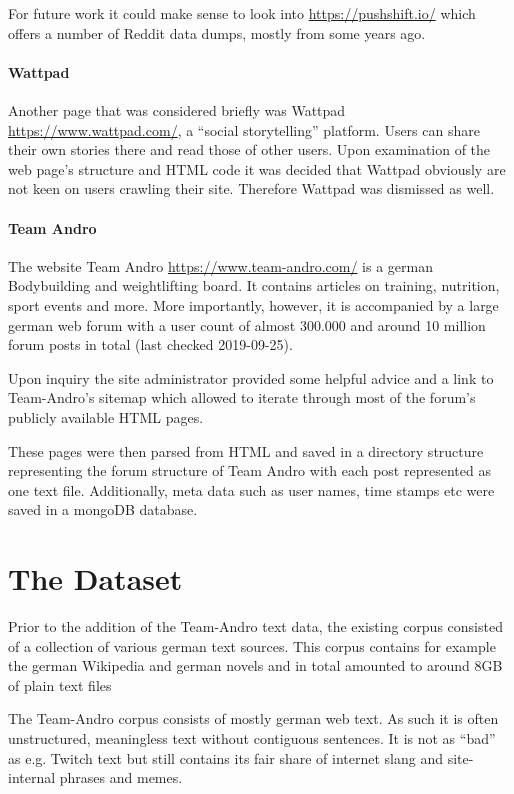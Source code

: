 \documentclass[sigconf,natbib=false]{acmart}
\begin{document}
For future work it could make sense to look into \url{https://pushshift.io/} which offers a number of Reddit data dumps, mostly from some years ago.

\paragraph{Wattpad}

Another page that was considered briefly was Wattpad \url{https://www.wattpad.com/}, a \enquote{social storytelling} platform. Users can share their own stories there and read those of other users. Upon examination of the web page's structure and HTML code it was decided that Wattpad obviously are not keen on users crawling their site. Therefore Wattpad was dismissed as well.

\paragraph{Team Andro} The website Team Andro \url{https://www.team-andro.com/} is a german Bodybuilding and weightlifting board. It contains articles on training, nutrition, sport events and more. More importantly, however, it is accompanied by a large german web forum with a user count of almost 300.000 and around 10 million forum posts in total (last checked 2019-09-25).

Upon inquiry the site administrator provided some helpful advice and a link to Team-Andro's sitemap which allowed to iterate through most of the forum's publicly available HTML pages.

These pages were then parsed from HTML and saved in a directory structure representing the forum structure of Team Andro with each post represented as one text file. Additionally, meta data such as user names, time stamps etc were saved in a mongoDB database.


\section{The Dataset}

Prior to the addition of the Team-Andro text data, the existing corpus consisted of a collection of various german text sources. This corpus contains for example the german Wikipedia and german novels and in total amounted to around 8GB of plain text files


The Team-Andro corpus consists of mostly german web text. As such it is often unstructured, meaningless text without contiguous sentences. It is not as \enquote{bad} as e.g. Twitch text but still contains its fair share of internet slang and site-internal phrases and memes.
\end{document}
